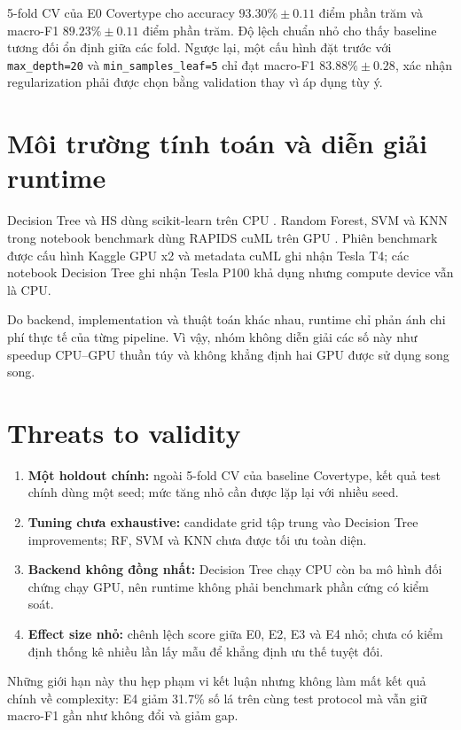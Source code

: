 5-fold CV của E0 Covertype cho accuracy $93.30\%\pm0.11$ điểm phần trăm và macro-F1 $89.23\%\pm0.11$ điểm phần trăm. Độ lệch chuẩn nhỏ cho thấy baseline tương đối ổn định giữa các fold. Ngược lại, một cấu hình đặt trước với \texttt{max\_depth=20} và \texttt{min\_samples\_leaf=5} chỉ đạt macro-F1 $83.88\%\pm0.28$, xác nhận regularization phải được chọn bằng validation thay vì áp dụng tùy ý.

\section{Môi trường tính toán và diễn giải runtime}

Decision Tree và HS dùng scikit-learn trên CPU \cite{pedregosa2011sklearn}. Random Forest, SVM và KNN trong notebook benchmark dùng RAPIDS cuML trên GPU \cite{rapidsCuml}. Phiên benchmark được cấu hình Kaggle GPU x2 và metadata cuML ghi nhận Tesla T4; các notebook Decision Tree ghi nhận Tesla P100 khả dụng nhưng compute device vẫn là CPU.

Do backend, implementation và thuật toán khác nhau, runtime chỉ phản ánh chi phí thực tế của từng pipeline. Vì vậy, nhóm không diễn giải các số này như speedup CPU--GPU thuần túy và không khẳng định hai GPU được sử dụng song song.

\section{Threats to validity}

\begin{enumerate}
    \item \textbf{Một holdout chính:} ngoài 5-fold CV của baseline Covertype, kết quả test chính dùng một seed; mức tăng nhỏ cần được lặp lại với nhiều seed.
    \item \textbf{Tuning chưa exhaustive:} candidate grid tập trung vào Decision Tree improvements; RF, SVM và KNN chưa được tối ưu toàn diện.
    \item \textbf{Backend không đồng nhất:} Decision Tree chạy CPU còn ba mô hình đối chứng chạy GPU, nên runtime không phải benchmark phần cứng có kiểm soát.
    \item \textbf{Effect size nhỏ:} chênh lệch score giữa E0, E2, E3 và E4 nhỏ; chưa có kiểm định thống kê nhiều lần lấy mẫu để khẳng định ưu thế tuyệt đối.
\end{enumerate}

Những giới hạn này thu hẹp phạm vi kết luận nhưng không làm mất kết quả chính về complexity: E4 giảm 31.7\% số lá trên cùng test protocol mà vẫn giữ macro-F1 gần như không đổi và giảm gap.
